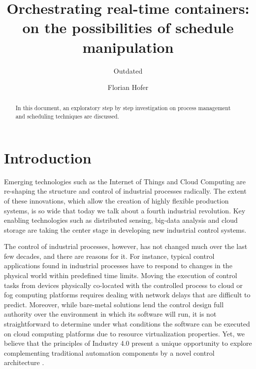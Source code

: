 \documentclass[]{scrartcl}
\title{Orchestrating real-time containers:\\ on the possibilities of schedule manipulation}
\subtitle{Outdated}
\author{Florian Hofer}
\begin{document}
\maketitle

\begin{abstract}
In this document, an exploratory step by step investigation on process management and scheduling techniques are discussed.
\end{abstract}

\section{Introduction}

Emerging technologies such as the Internet of Things and Cloud Computing are re-shaping the structure and control of industrial processes radically. 
The extent of these innovations, which allow the creation of highly flexible production systems, is so wide that today we talk about a fourth industrial revolution.
Key enabling technologies such as distributed sensing, big-data analysis and cloud storage are taking the center stage in developing new industrial control systems.

The control of industrial processes, however, has not changed much over the last few decades, and there are reasons for it.
For instance, typical control applications found in industrial processes have to respond to changes in the physical world within predefined time limits.
Moving the execution of control tasks from devices physically co-located with the controlled process to cloud or fog computing platforms requires dealing with network delays that are difficult to predict.
Moreover, while bare-metal solutions lend the control design full authority over the environment in which its software will run, it is not straightforward to determine under what conditions the software can be executed on cloud computing platforms due to resource virtualization properties.
Yet, we believe that the principles of Industry 4.0 present a unique opportunity to explore complementing traditional automation components by a novel control architecture \cite{Tascietal2018}.
\end{document}
